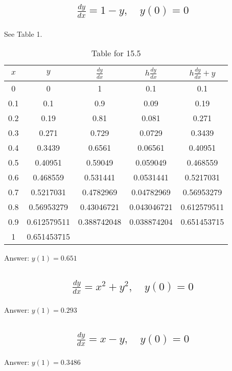 \documentclass{article}
\begin{document}
\subsection{
	\begin{align*}
		\frac{dy}{dx} = 1 - y, \quad y(0) = 0
	\end{align*}
}
See Table 1. \\[10pt]
\begin{table}[h!]
\centering
\begin{tabular}{|c|c|c|c|c|}
\hline
$x$ & $y$ & $\frac{dy}{dx}$ & $h\frac{dy}{dx}$ & $h\frac{dy}{dx} + y$ \\ \hline
0 	& 0		 	& 1			& 0.1			& 0.1			\\ \hline
0.1 	& 0.1	 		& 0.9			& 0.09		& 0.19		\\ \hline
0.2 	& 0.19	 	& 0.81		& 0.081		& 0.271		\\ \hline
0.3 	& 0.271 		& 0.729		& 0.0729		& 0.3439		\\ \hline
0.4 	& 0.3439		& 0.6561		& 0.06561		& 0.40951		\\ \hline
0.5 	& 0.40951		& 0.59049		& 0.059049	& 0.468559	\\ \hline
0.6 	& 0.468559	& 0.531441	& 0.0531441	& 0.5217031	\\ \hline
0.7 	& 0.5217031	& 0.4782969	& 0.04782969	& 0.56953279	\\ \hline
0.8 	& 0.56953279	& 0.43046721	& 0.043046721	& 0.612579511	\\ \hline
0.9 	& 0.612579511	& 0.388742048	& 0.038874204	& 0.651453715	\\ \hline
1 	& 0.651453715
\end{tabular}
\caption{Table for 15.5}
\end{table}
Answer: $y(1) = 0.651$

\subsection{
	\begin{align*}
		\frac{dy}{dx} = x^2 + y^2, \quad y(0) = 0
	\end{align*}
}
Answer: $y(1)  = 0.293$

\subsection{
	\begin{align*}
		\frac{dy}{dx} = x - y, \quad y(0) = 0
	\end{align*}
}
Answer: $y(1) = 0.3486$
\end{document}
